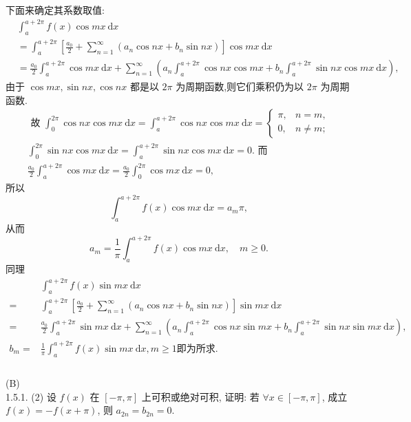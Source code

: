 \documentclass[a4paper,11pt,UTF8]{article}
\begin{document}
下面来确定其系数取值:
$$
\begin{aligned}
	& \int_a^{a+2 \pi} f(x) \cos m x \mathrm{~d} x \\
	& =\int_a^{a+2 \pi}\left[\frac{a_0}{2}+\sum_{n=1}^{\infty}\left(a_n \cos n x+b_n \sin n x\right)\right] \cos m x \mathrm{~d} x \\
	& =\frac{a_0}{2} \int_a^{a+2 \pi} \cos m x \mathrm{~d} x+\sum_{n=1}^{\infty}\left(a_n \int_a^{a+2 \pi} \cos n x \cos m x+b_n \int_a^{a+2 \pi} \sin n x \cos m x \mathrm{~d} x\right),
\end{aligned}
$$
由于 $\displaystyle \cos m x, \sin n x, \cos n x$ 都是以 $2 \pi$ 为周期函数,则它们乘积仍为以 $2 \pi$ 为周期 函数.\\
$$
\begin{gathered}
	\text { 故 } \int_0^{2 \pi} \cos n x \cos m x \mathrm{~d} x=\int_a^{a+2 \pi} \cos n x \cos m x \mathrm{~d} x= \begin{cases}\pi, & n=m, \\
		0, & n \neq m ;\end{cases} \\
	\int_0^{2 \pi} \sin n x \cos m x \mathrm{~d} x=\int_a^{a+2 \pi} \sin n x \cos m x \mathrm{~d} x=0 \text {. 而 } \\
	\frac{a_0}{2} \int_a^{a+2 \pi} \cos m x \mathrm{~d} x=\frac{a_0}{2} \int_0^{2 \pi} \cos m x \mathrm{~d} x=0,
\end{gathered}
$$
所以
$$
\int_a^{a+2 \pi} f(x) \cos m x \mathrm{~d} x=a_m \pi,
$$
从而
$$
a_m=\frac{1}{\pi} \int_a^{a+2 \pi} f(x) \cos m x \mathrm{~d} x, \quad m \geq 0 .
$$
同理
$$
\begin{aligned}
	& \int_a^{a+2 \pi} f(x) \sin m x \mathrm{~d} x \\
	 =&\int_a^{a+2 \pi}\left[\frac{a_0}{2}+\sum_{n=1}^{\infty}\left(a_n \cos n x+b_n \sin n x\right)\right] \sin m x \mathrm{~d} x\\
  =&\frac{a_0}{2} \int_a^{a+2 \pi} \sin m x \mathrm{~d} x+\sum_{n=1}^{\infty}\left(a_n \int_a^{a+2 \pi} \cos n x \sin m x+b_n \int_a^{a+2 \pi} \sin n x \sin m x \mathrm{~d} x\right),\\
 b_m=&\frac{1}{\pi} \int_a^{a+2 \pi} f(x) \sin m x \mathrm{~d} x, m \geq 1\text{即为所求}.\\
\end{aligned}
$$\\
(B)\\
1.5.1. (2) 设 $\displaystyle f(x)$ 在 $[-\pi, \pi]$ 上可积或绝对可积, 证明:
若 $\displaystyle \forall x \in[-\pi, \pi]$, 成立 $\displaystyle f(x)=-f(x+\pi)$, 则 $a_{2 n}=b_{2 n}=0$.\\
\end{document}
